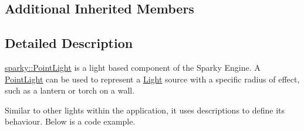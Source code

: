 \subsection*{Additional Inherited Members}


\subsection{Detailed Description}
\hyperlink{classsparky_1_1_point_light}{sparky\+::\+Point\+Light} is a light based component of the Sparky Engine. A \hyperlink{classsparky_1_1_point_light}{Point\+Light} can be used to represent a \hyperlink{classsparky_1_1_light}{Light} source with a specific radius of effect, such as a lantern or torch on a wall.

Similar to other lights within the application, it uses descriptions to define it\textquotesingle{}s behaviour. Below is a code example.

